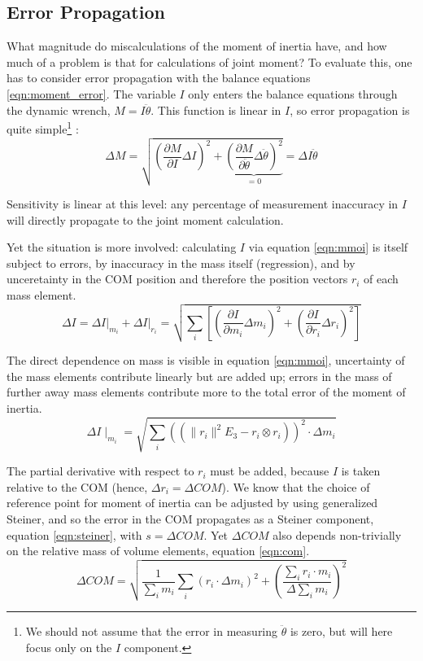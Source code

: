\subsection{Error Propagation}
\label{sec:org7ced92a}
What magnitude do miscalculations of the moment of inertia have, and how much of a problem is that for calculations of joint moment?
To evaluate this, one has to consider error propagation \citep{Hughes2010,Arroyave2022,Myers2015} with the balance equations \eqref{eqn:moment_error}.
The variable \(I\) only enters the balance equations through the dynamic wrench, \(M = I \ddot\theta\).
This function is linear in \(I\), so error propagation is quite simple\footnote{We should not assume that the error in measuring \(\ddot \theta\) is zero, but will here focus only on the \(I\) component.} \citep{Normann2016}:
\begin{equation}\label{eqn:moment_error}
\Delta M = \sqrt{\left(\frac{\partial M}{\partial I}\Delta I\right)^2 + \underbrace{\left(\frac{\partial M}{\partial \ddot \theta}\Delta \ddot \theta\right)^2}_{=0} } = \Delta I \ddot\theta
\end{equation}


Sensitivity is linear at this level: any percentage of measurement inaccuracy in \(I\) will directly propagate to the joint moment calculation.


Yet the situation is more involved: calculating \(I\) via equation \eqref{eqn:mmoi} is itself subject to errors, by inaccuracy in the mass itself (regression), and by unceretainty in the COM position and therefore the position vectors \(r_{i}\) of each mass element.
\[ \Delta I = \left. \Delta I \right|_{m_i} + \left. \Delta I \right|_{r_i} = \sqrt{ \sum_{i} \left[ \left(\frac{\partial I}{\partial m_{i}} \Delta m_{i} \right)^2 + \left(\frac{\partial I}{\partial r_{i}} \Delta r_{i}\right)^2 \right] }\]


The direct dependence on mass is visible in equation \eqref{eqn:mmoi}, uncertainty of the mass elements contribute linearly but are added up; errors in the mass of further away mass elements contribute more to the total error of the moment of inertia.
\[ \Delta I \mid_{m_i} = \sqrt{\sum\limits_{i}\left(\left( \lVert r_{i} \rVert ^2 E_3 - r_{i} \otimes r_{i} \right)\right)^2 \cdot \Delta m_{i} }\]


The partial derivative with respect to \(r_{i}\) must be added, because \(I\) is taken relative to the COM (hence, \(\Delta r_i = \Delta COM\)).
We know that the choice of reference point for moment of inertia can be adjusted by using generalized Steiner, and so the error in the COM propagates as a Steiner component, equation \eqref{eqn:steiner}, with \(s=\Delta COM\).
Yet \(\Delta COM\) also depends non-trivially on the relative mass of volume elements, equation \eqref{eqn:com}.
\[ \Delta COM = \sqrt{ \frac{1}{\sum_i m_{i}} \sum\limits_{i} \left( r_{i} \cdot \Delta m_{i} \right)^2  + \left( \frac{ \sum\limits_{i} r_{i} \cdot m_{i} }{\Delta \sum_i m_{i} }\right)^{2}}\]


